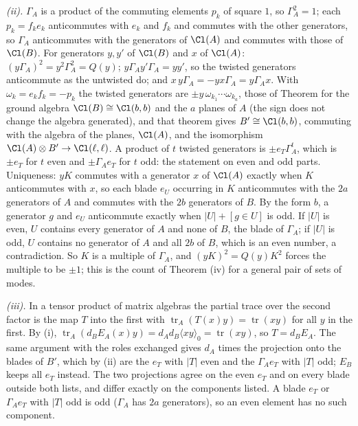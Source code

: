 \emph{(ii).} $\Gamma_{A}$ is a product of the commuting elements $p_{k}$ of square $1$, so $\Gamma_{A}^{2} = 1$; each $p_{k} = f_{k}e_{k}$ anticommutes with $e_{k}$ and $f_{k}$ and commutes with the other generators, so $\Gamma_{A}$ anticommutes with the generators of $\Cl(A)$ and commutes with those of $\Cl(B)$. For generators $y, y'$ of $\Cl(B)$ and $x$ of $\Cl(A)$: $(y\Gamma_{A})^{2} = y^{2}\Gamma_{A}^{2} = Q(y)$; $y\Gamma_{A}y'\Gamma_{A} = yy'$, so the twisted generators anticommute as the untwisted do; and $x\,y\Gamma_{A} = -yx\Gamma_{A} = y\Gamma_{A}x$. With $\omega_{k} = e_{k}f_{k} = -p_{k}$ the twisted generators are $\pm y\,\omega_{k_{1}}\cdots\omega_{k_{a}}$, those of Theorem  for the ground algebra $\Cl(B) \cong \Cl(b,b)$ and the $a$ planes of $A$ (the sign does not change the algebra generated), and that theorem gives $B' \cong \Cl(b,b)$, commuting with the algebra of the planes, $\Cl(A)$, and the isomorphism $\Cl(A) \otimes B' \to \Cl(\ell,\ell)$. A product of $t$ twisted generators is $\pm e_{T}\Gamma_{A}^{t}$, which is $\pm e_{T}$ for $t$ even and $\pm\Gamma_{A}e_{T}$ for $t$ odd: the statement on even and odd parts. Uniqueness: $yK$ commutes with a generator $x$ of $\Cl(A)$ exactly when $K$ anticommutes with $x$, so each blade $e_{U}$ occurring in $K$ anticommutes with the $2a$ generators of $A$ and commutes with the $2b$ generators of $B$. By the form $b$, a generator $g$ and $e_{U}$ anticommute exactly when $|U| + [g \in U]$ is odd. If $|U|$ is even, $U$ contains every generator of $A$ and none of $B$, the blade of $\Gamma_{A}$; if $|U|$ is odd, $U$ contains no generator of $A$ and all $2b$ of $B$, which is an even number, a contradiction. So $K$ is a multiple of $\Gamma_{A}$, and $(yK)^{2} = Q(y)K^{2}$ forces the multiple to be $\pm 1$; this is the count of Theorem (iv) for a general pair of sets of modes.

\emph{(iii).} In a tensor product of matrix algebras the partial trace over the second factor is the map $T$ into the first with $\operatorname{tr}_{A}(T(x)y) = \operatorname{tr}(xy)$ for all $y$ in the first. By (i), $\operatorname{tr}_{A}(d_{B}E_{A}(x)y) = d_{A}d_{B}\langle xy\rangle_{0} = \operatorname{tr}(xy)$, so $T = d_{B}E_{A}$. The same argument with the roles exchanged gives $d_{A}$ times the projection onto the blades of $B'$, which by (ii) are the $e_{T}$ with $|T|$ even and the $\Gamma_{A}e_{T}$ with $|T|$ odd; $E_{B}$ keeps all $e_{T}$ instead. The two projections agree on the even $e_{T}$ and on every blade outside both lists, and differ exactly on the components listed. A blade $e_{T}$ or $\Gamma_{A}e_{T}$ with $|T|$ odd is odd ($\Gamma_{A}$ has $2a$ generators), so an even element has no such component.

